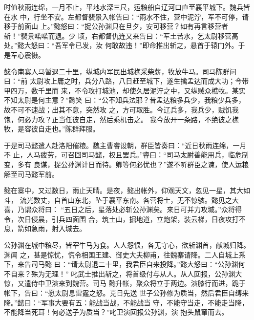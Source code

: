 时值秋雨连绵，一月不止，平地水深三尺，运粮船自辽河口直至襄平城下。魏兵皆在水
中，行坐不安。左都督裴景入帐告曰：“雨水不住，营中泥泞，军不可停，请移于前面山
上。”懿怒曰：“捉公孙渊只在旦夕，安可移营？如有再言移营者斩！”裴景喏喏而退。少
顷，右都督仇连又来告曰：“军土苦水，乞太尉移营高处。”懿大怒曰：“吾军令已发，汝
何敢故违！”即命推出斩之，悬首于辕门外。于是军心震慑。

懿令南寨人马暂退二十里，纵城内军民出城樵采柴薪，牧放牛马。司马陈群问曰：“前
太尉攻上庸之时，兵分八路，八日赶至城下，遂生擒孟达而成大功；今带甲四万，数千里而
来，不令攻打城池，却使久居泥泞之中，又纵贼众樵牧。某实不知太尉是何主意？”懿笑
曰：“公不知兵法耶？昔孟达粮多兵少，我粮少兵多，故不可不速战；出其不意，突然攻
之，方可取胜。今辽兵多，我兵少，贼饥我饱，何必力攻？正当任彼自走，然后乘机击之。
我今放开一条路，不绝彼之樵牧，是容彼自走也。”陈群拜服。

于是司马懿遣人赴洛阳催粮。魏主曹睿设朝，群臣皆奏曰：“近日秋雨连绵，一月不
止，人马疲劳，可召回司马懿，权且罢兵。”睿曰：“司马太尉善能用兵，临危制变，多有
良谋，捉公孙渊计日而待。卿等何必忧也？”遂不听群臣之谏，使人运粮解至司马懿军前。

懿在寨中，又过数日，雨止天晴。是夜，懿出帐外，仰观天文，忽见一星，其大如斗，
流光数丈，自首山东北，坠于襄平东南。各营将士，无不惊骇。懿见之大喜，乃谓众将曰：
“五日之后，星落处必斩公孙渊矣。来日可并力攻城。”众将得令，次日侵晨，引兵四面围
合，筑土山，掘地道，立炮架，装云梯，日夜攻打不息，箭如急雨，射入城去。

公孙渊在城中粮尽，皆宰牛马为食。人人怨恨，各无守心，欲斩渊首，献城归降。渊闻
之，甚是惊忧，慌令相国王建、御史大夫柳甫，往魏寨请降。二人自城上系下，来告司马懿
曰：“请太尉退二十里，我君臣自来投降。”懿大怒曰：“公孙渊何不自来？殊为无理！”
叱武士推出斩之，将首级付与从人。从人回报，公孙渊大惊，又遣侍中卫演来到魏营。司马
懿升帐，聚众将立于两边。演膝行而进，跪于帐下，告曰：“愿太尉息雷霆之怒。克日先送
世子公孙修为质当，然后君臣自缚来降。”懿曰：“军事大要有五：能战当战，不能战当
守，不能守当走，不能走当降，不能降当死耳！何必送子为质当？”叱卫演回报公孙渊，演
抱头鼠窜而去。

